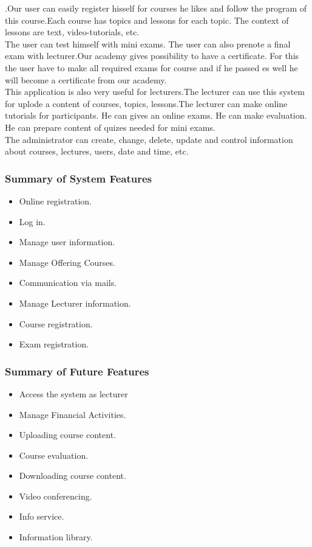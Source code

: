 \documentclass{scrartcl}
\begin{document}
  	.Our user can easily register hisself for courses he likes and follow the program of this course.Each course has topics and lessons for each topic. The context of lessons are text, video-tutorials, etc. \\
  	The user can test himself with mini exams. The user can also prenote a final exam with lecturer.Our academy gives possibility to have a certificate. For this the user have to make all required exams for course and if he passed es well he will become a certificate from our academy. \\
  	This application is also very useful for lecturers.The lecturer can use this system for uplode a content of courses, topics, lessons.The lecturer can make online tutorials for participants. He can gives an online exams. He can make evaluation. He can prepare content of quizes needed for mini exams.\\
  	The administrator can create, change, delete, update and control information about courses, lectures, users, date and time, etc.
  	
  	
  	\subsubsection{Summary of System Features}
  	\begin{itemize}
  	\item Online registration.
  	\item Log in.
  	\item Manage user information.
  	\item Manage Offering Courses.
  	\item Communication via mails.
  	\item Manage Lecturer information.
  	\item Course registration.
  	\item Exam registration.
  	\end{itemize}
  	
  	\subsubsection{Summary of Future Features}
  	\begin{itemize}
  	\item Access the system as lecturer
  	\item Manage Financial Activities.
  	\item Uploading course content.
  	\item Course evaluation.
  	\item Downloading course content.
  	\item Video conferencing.
  	\item Info service.
  	\item Information library.
  	\end{itemize}
  	
\end{document}

